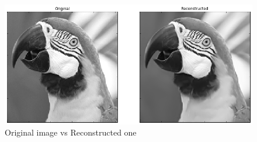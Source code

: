 \begin{figure}[h]
 \centering
 \includegraphics[scale=0.4]{../Results/SPORCO_test_img/recons.png}
 \caption{Original image vs Reconstructed one}
\end{figure}

